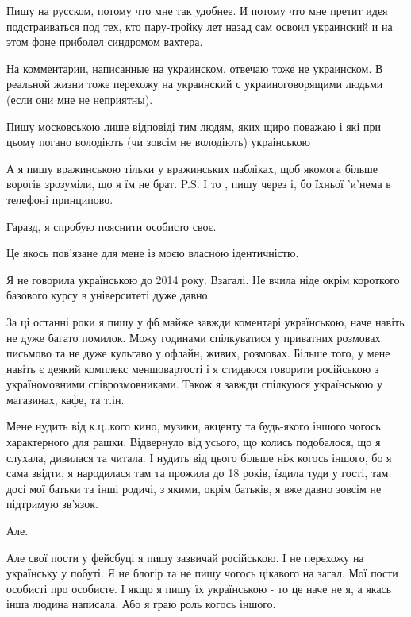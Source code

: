 \begin{itemize}

Пишу на русском, потому что мне так удобнее. И потому что мне претит идея
подстраиваться под тех, кто пару-тройку лет назад сам освоил украинский и на
этом фоне приболел синдромом вахтера.

На комментарии, написанные на украинском, отвечаю тоже не украинском. В
реальной жизни тоже перехожу на украинский с украиноговорящими людьми (если они
мне не неприятны).


Пишу московською лише відповіді тим людям, яких щиро поважаю і які при цьому
погано володіють (чи зовсім не володіють) украінською

\begin{itemize} %
А я пишу вражинською тільки у вражинських пабліках, щоб якомога більше ворогів зрозуміли, що я їм не брат.
P.S. І то , пишу через і, бо їхньої 'и'нема в телефоні принципово.
\end{itemize} %


Гаразд, я спробую пояснити особисто своє.

Це якось пов'язане для мене із моєю власною ідентичністю.

Я не говорила українською до 2014 року. Взагалі. Не вчила ніде окрім короткого
базового курсу в університеті дуже давно.

За ці останні роки я пишу у фб майже завжди коментарі українською, наче навіть
не дуже багато помилок. Можу годинами спілкуватися у приватних розмовах
письмово та не дуже кульгаво у офлайн, живих, розмовах. Більше того, у мене
навіть є деякий комплекс меншовартості і я стидаюся говорити російською з
україномовними співрозмовниками. Також я завжди спілкуюся українською у
магазинах, кафе, та т.ін.

Мене нудить від к.ц..кого кино, музики, акценту та будь-якого іншого чогось
характерного для рашки. Відвернуло від усього, що колись подобалося, що я
слухала, дивилася та читала. І нудить від цього більше ніж когось іншого, бо я
сама звідти, я народилася там та прожила до 18 років, їздила туди у гості, там
досі мої батьки та інші родичі, з якими, окрім батьків, я вже давно зовсім не
підтримую зв'язок.

Але.

Але свої пости у фейсбуці я пишу зазвичай російською. І не перехожу на
українську у побуті. Я не блогір та не пишу чогось цікавого на загал. Мої пости
особисті про особисте. І якщо я пишу їх українською - то це наче не я, а якась
інша людина написала. Або я граю роль когось іншого.


\end{itemize}
